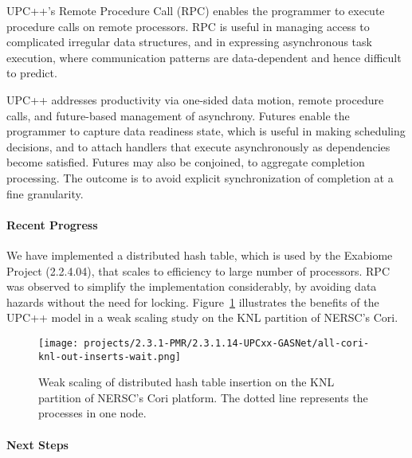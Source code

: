 UPC++'s Remote Procedure Call (RPC)
enables the programmer
to execute procedure calls on remote processors.
RPC is useful in managing access to complicated irregular data structures,
and in expressing asynchronous task execution, where communication patterns
are data-dependent and hence difficult to predict.

UPC++ addresses productivity via one-sided data motion, remote procedure calls,
and future-based management of asynchrony.
Futures enable the programmer
to capture data readiness state,
which is useful in making scheduling decisions,
and to attach handlers that 
execute asynchronously as dependencies become
satisfied. Futures may also be conjoined, to aggregate
completion processing. The outcome is to avoid explicit synchronization of completion at a fine granularity.



\paragraph{Recent Progress}

We have implemented a distributed hash table,
which is used by the Exabiome Project (2.2.4.04), that scales to efficiency
to large number of processors. RPC was observed to simplify the implementation
considerably, by avoiding data hazards without the need for locking.
Figure~\ref{fig:dht} illustrates the benefits of the UPC++ model 
in a weak scaling study on the KNL partition of NERSC's Cori.




\begin{figure}[htb]
\centering
      \texttt{[image: projects/2.3.1-PMR/2.3.1.14-UPCxx-GASNet/all-cori-knl-out-inserts-wait.png]}
  \caption{Weak scaling of distributed hash table insertion on the KNL partition of NERSC's Cori platform. The dotted line represents the processes in one node.}
  \label{fig:dht}
\end{figure}



\paragraph{Next Steps}

